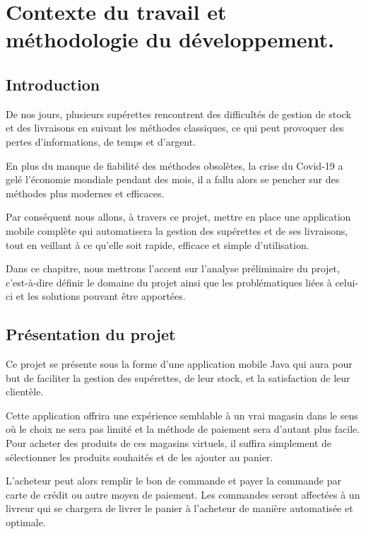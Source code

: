 \documentclass{report}
\begin{document}
\clearpage
{}

\tableofcontents
\newpage

\chapter{Contexte du travail et méthodologie du développement.}

\section{Introduction}
De nos jours, plusieurs supérettes rencontrent des difficultés de gestion de stock et des livraisons en suivant les méthodes classiques, ce qui peut provoquer des pertes d’informations, de temps et d'argent.

En plus du manque de fiabilité des méthodes obsolètes, la crise du Covid-19 a gelé l'économie mondiale pendant des mois, il a fallu alors se pencher sur des méthodes plus modernes et efficaces.

Par conséquent nous allons, à travers ce projet, mettre en place une application mobile complète qui automatisera la gestion des supérettes et de ses livraisons, tout en veillant à ce qu’elle soit rapide, efficace et simple d’utilisation.

Dans ce chapitre, nous mettrons l’accent sur l’analyse préliminaire du projet, c'est-à-dire définir le domaine du projet ainsi que les problématiques liées à celui-ci et les solutions pouvant être apportées.

\section{Présentation du projet}
Ce projet se présente sous la forme d'une application mobile Java qui aura pour but de faciliter la gestion des supérettes, de leur stock, et la satisfaction de leur clientèle.

Cette application offrira une expérience semblable à un vrai magasin dans le sens où le choix ne sera pas limité et la méthode de paiement sera d'autant plus facile. Pour acheter des produits de ces magasins virtuels, il suffira simplement de sélectionner les produits souhaités et de les ajouter au panier.

L’acheteur peut alors remplir le bon de commande et payer la commande par carte de crédit ou autre moyen de paiement. Les commandes seront affectées à un livreur qui se chargera de livrer le panier à l'acheteur de manière automatisée et optimale.
\end{document}
